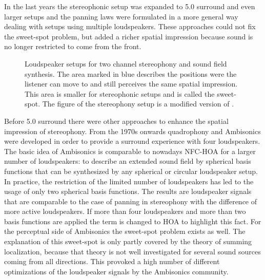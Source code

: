 \documentclass[a4paper]{book}
\newcommand{\reproduce}[1]{%
    \href{#1}{\color{link}\large\Pointinghand}%
}%
\newcommand{\ft}{\footnotesize}                                   %
\newcommand{\degree}{^\circ}                         %
\begin{document}
In the last years the stereophonic setup was expanded to 5.0 surround
and even larger setups\cite[E.g.][]{Hamasaki2005} and the panning laws were
formulated in a more general way dealing with setups using multiple
loudspeakers.\cite{Pulkki1997}
These approaches could not fix the sweet-spot problem, but added a richer
spatial impression because sound is no longer restricted to come from the front.
%
\begin{figure}[t]
    \centering
    \small
    \caption{Loudspeaker setups for two channel stereophony
    and sound field synthesis. The area marked in blue describes the positions were the
    listener can move to and still perceives the same spatial impression. This
    area is smaller for stereophonic setups and is called the
    sweet-spot. The figure of the stereophony setup is a modified version of
    \cite[][Fig.\,1.1]{Ahrens2012}.
    \reproduce{\GITHUB/fig1_02}}
    \label{fig:stereophony}
\end{figure}

Before 5.0 surround there were other approaches to enhance the spatial impression of
stereophony. From the 1970s onwards quadro\-phony and
Ambisonics\cite{Gerzon1973} were developed in
order to provide a surround experience with four loudspeakers. The basic idea of
Ambisonics is comparable to nowadays NFC-HOA for
a larger number of loudspeakers: to describe an extended sound field by spherical
basis functions that can be synthesized by any spherical or circular loudspeaker
setup. In practice, the restriction of the limited number of loudspeakers has led to the usage
of only two spherical basis functions. The results are
loudspeaker signals that are comparable to the case of panning in
stereophony with the difference of more active
loudspeakers.\cite[E.g.][]{Frank2013}
If more than four loudspeakers and more than two basis functions
are applied the term is changed to HOA to highlight this fact.
For the perceptual side of Ambisonics the sweet-spot problem exists as well.
The explanation of this sweet-spot is only partly covered by the
theory of summing localization, because that theory is not well investigated for
several sound sources coming from all directions. This provoked a high number of
different optimizations of the loudspeaker signals by the Ambisonics community.
\end{document}
